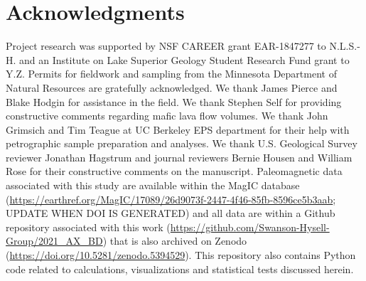 \section{Acknowledgments}
Project research was supported by NSF CAREER grant EAR-1847277 to N.L.S.-H. and an Institute on Lake Superior Geology Student Research Fund grant to Y.Z. Permits for fieldwork and sampling from the Minnesota Department of Natural Resources are gratefully acknowledged. We thank James Pierce and Blake Hodgin for assistance in the field. We thank Stephen Self for providing constructive comments regarding mafic lava flow volumes. We thank John Grimsich and Tim Teague at UC Berkeley EPS department for their help with petrographic sample preparation and analyses. We thank U.S. Geological Survey reviewer Jonathan Hagstrum and journal reviewers Bernie Housen and William Rose for their constructive comments on the manuscript. Paleomagnetic data associated with this study are available within the MagIC database (\url{https://earthref.org/MagIC/17089/26d9073f-2447-4f46-85fb-8596ce5b3aab}; UPDATE WHEN DOI IS GENERATED) and all data are within a Github repository associated with this work (\url{https://github.com/Swanson-Hysell-Group/2021_AX_BD}) that is also archived on Zenodo (\url{https://doi.org/10.5281/zenodo.5394529}). This repository also contains Python code related to calculations, visualizations and statistical tests discussed herein.  


